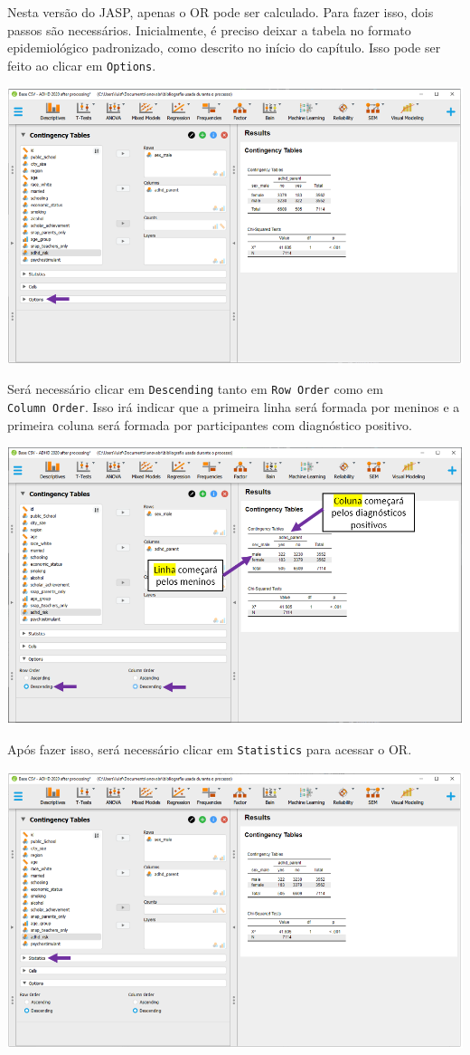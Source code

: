 \documentclass[
]{book}
\begin{document}
Nesta versão do JASP, apenas o OR pode ser calculado. Para fazer isso, dois passos são necessários. Inicialmente, é preciso deixar a tabela no formato epidemiológico padronizado, como descrito no início do capítulo. Isso pode ser feito ao clicar em \texttt{Options}.

\includegraphics{./img/cap_x2_options.png}

Será necessário clicar em \texttt{Descending} tanto em \texttt{Row\ Order} como em \texttt{Column\ Order}. Isso irá indicar que a primeira linha será formada por meninos e a primeira coluna será formada por participantes com diagnóstico positivo.

\includegraphics{./img/cap_x2_row_order.png}

Após fazer isso, será necessário clicar em \texttt{Statistics} para acessar o OR.

\includegraphics{./img/cap_x2_statistics.png}
\end{document}
